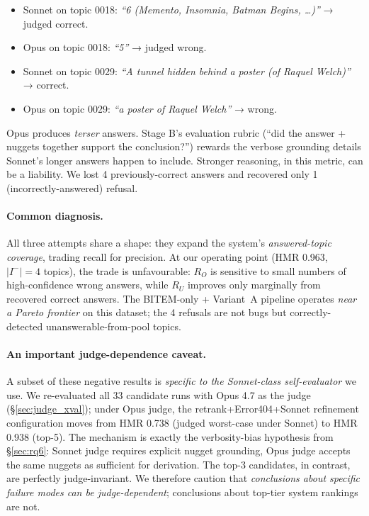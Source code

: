 \documentclass[11pt,a4paper]{article}
\newcommand{\HMR}{\textsc{HMR}}
\begin{document}
\begin{itemize}
  \item Sonnet on topic 0018: \emph{``6 (Memento, Insomnia, Batman Begins,
    \ldots)''} → judged correct.
  \item Opus on topic 0018: \emph{``5''} → judged wrong.
  \item Sonnet on topic 0029: \emph{``A tunnel hidden behind a poster
    (of Raquel Welch)''} → correct.
  \item Opus on topic 0029: \emph{``a poster of Raquel Welch''} → wrong.
\end{itemize}

Opus produces \emph{terser} answers. Stage B's evaluation rubric (``did the
answer + nuggets together support the conclusion?'') rewards the verbose
grounding details Sonnet's longer answers happen to include. Stronger
reasoning, in this metric, can be a liability. We lost 4 previously-correct
answers and recovered only 1 (incorrectly-answered) refusal.

\paragraph{Common diagnosis.} All three attempts share a shape: they
expand the system's \emph{answered-topic coverage}, trading recall for
precision. At our operating point (\HMR{} 0.963, $|I^-|=4$ topics), the
trade is unfavourable: $R_O$ is sensitive to small numbers of
high-confidence wrong answers, while $R_U$ improves only marginally from
recovered correct answers. The BITEM-only + Variant~A pipeline operates
\emph{near a Pareto frontier} on this dataset; the 4 refusals are not
bugs but correctly-detected unanswerable-from-pool topics.

\paragraph{An important judge-dependence caveat.} A subset of these
negative results is \emph{specific to the Sonnet-class self-evaluator}
we use. We re-evaluated all 33 candidate runs with Opus 4.7 as the
judge (\S\ref{sec:judge_xval}); under Opus judge, the
retrank+Error404+Sonnet refinement configuration moves from \HMR{}
0.738 (judged worst-case under Sonnet) to \HMR{} 0.938 (top-5). The
mechanism is exactly the verbosity-bias hypothesis from \S\ref{sec:rq6}:
Sonnet judge requires explicit nugget grounding, Opus judge accepts
the same nuggets as sufficient for derivation. The top-3 candidates,
in contrast, are perfectly judge-invariant. We therefore caution that
\emph{conclusions about specific failure modes can be judge-dependent};
conclusions about top-tier system rankings are not.
\end{document}
